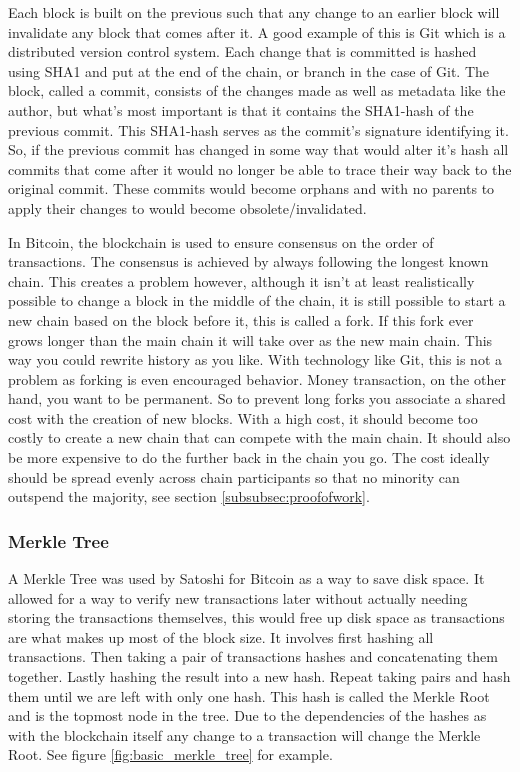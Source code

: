 \documentclass[12pt]{article}
\begin{document}
Each block is built on the previous such that any change to an earlier block will invalidate any block that comes after it. A good example of this is Git which is a distributed version control system. Each change that is committed is hashed using SHA1 and put at the end of the chain, or branch in the case of Git. The block, called a commit, consists of the changes made as well as metadata like the author, but what's most important is that it contains the SHA1-hash of the previous commit. This SHA1-hash serves as the commit's signature identifying it. So, if the previous commit has changed in some way that would alter it's hash all commits that come after it would no longer be able to trace their way back to the original commit. These commits would become orphans and with no parents to apply their changes to would become obsolete/invalidated.


In Bitcoin, the blockchain is used to ensure consensus on the order of transactions. The consensus is achieved by always following the longest known chain. This creates a problem however, although it isn't at least realistically possible to change a block in the middle of the chain, it is still possible to start a new chain based on the block before it, this is called a fork. If this fork ever grows longer than the main chain it will take over as the new main chain. This way you could rewrite history as you like. With technology like Git, this is not a problem as forking is even encouraged behavior. Money transaction, on the other hand, you want to be permanent. So to prevent long forks you associate a shared cost with the creation of new blocks. With a high cost, it should become too costly to create a new chain that can compete with the main chain. It should also be more expensive to do the further back in the chain you go. The cost ideally should be spread evenly across chain participants so that no minority can outspend the majority, see section \ref{subsubsec:proofofwork}.


\subsubsection{Merkle Tree}\label{subsubsec:merkle_tree}

A Merkle Tree was used by Satoshi for Bitcoin as a way to save disk space. It allowed for a way to verify new transactions later without actually needing storing the transactions themselves, this would free up disk space as transactions are what makes up most of the block size. It involves first hashing all transactions. Then taking a pair of transactions hashes and concatenating them together. Lastly hashing the result into a new hash. Repeat taking pairs and hash them until we are left with only one hash. This hash is called the Merkle Root and is the topmost node in the tree. Due to the dependencies of the hashes as with the blockchain itself any change to a transaction will change the Merkle Root. See figure \ref{fig:basic_merkle_tree} for example.
\end{document}
